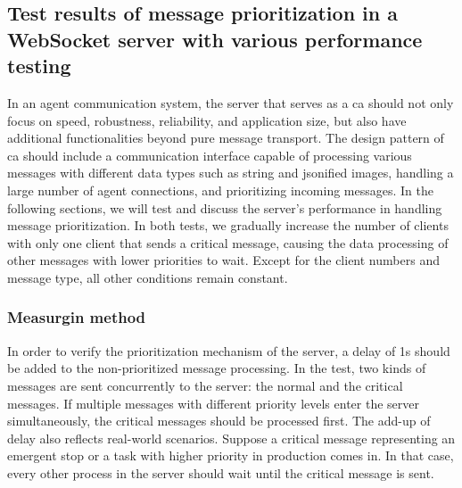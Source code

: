 \subsection{Test results of message prioritization in a WebSocket server with various 
performance testing} \label{chap: Result-priority}
In an agent communication system, the server that serves as a \gls{ca} should not only 
focus on speed, robustness, reliability, and application size, but also have additional 
functionalities beyond pure message transport. The design pattern of \gls{ca} should 
include a communication interface 
capable of processing various messages with different data types such as string 
and jsonified images, 
handling a large number of agent connections, and prioritizing incoming messages. 
In the following sections, we will test and discuss the server's performance in 
handling message prioritization. In both tests, we gradually increase the number 
of clients with only one client that sends a critical message, causing the data processing 
of other messages with lower priorities to wait. Except for the client numbers and 
message type, all other conditions remain constant. 

\subsubsection{Measurgin method}
In order to verify the prioritization mechanism of the server, a delay of 1s should be 
added to the non-prioritized message processing. In the test, two kinds of messages are 
sent concurrently to the server: the normal and the critical messages. If multiple 
messages with different priority levels enter the server simultaneously, the critical 
messages should be processed first. The add-up of delay also reflects real-world scenarios. 
Suppose a critical message representing an emergent stop or a task with higher priority 
in production comes in. In that case, every other process in the server should wait until 
the critical message is sent. 

